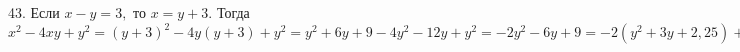 43. Если $x-y=3,$ то $x=y+3.$ Тогда $x^2-4xy+y^2=(y+3)^2-4y(y+3)+y^2=y^2+6y+9-4y^2-12y+y^2=-2y^2-6y+9=-2(y^2+3y+2,25)+13,5=
-2(y+1,5)^2+13,5\leqslant13,5.$\\

